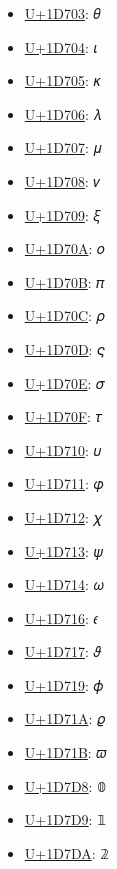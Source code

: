 \begin{itemize}
	\item \href{https://decodeunicode.org/en/u+1D703}{U+1D703}: 𝜃
	\item \href{https://decodeunicode.org/en/u+1D704}{U+1D704}: 𝜄
	\item \href{https://decodeunicode.org/en/u+1D705}{U+1D705}: 𝜅
	\item \href{https://decodeunicode.org/en/u+1D706}{U+1D706}: 𝜆
	\item \href{https://decodeunicode.org/en/u+1D707}{U+1D707}: 𝜇
	\item \href{https://decodeunicode.org/en/u+1D708}{U+1D708}: 𝜈
	\item \href{https://decodeunicode.org/en/u+1D709}{U+1D709}: 𝜉
	\item \href{https://decodeunicode.org/en/u+1D70A}{U+1D70A}: 𝜊
	\item \href{https://decodeunicode.org/en/u+1D70B}{U+1D70B}: 𝜋
	\item \href{https://decodeunicode.org/en/u+1D70C}{U+1D70C}: 𝜌
	\item \href{https://decodeunicode.org/en/u+1D70D}{U+1D70D}: 𝜍
	\item \href{https://decodeunicode.org/en/u+1D70E}{U+1D70E}: 𝜎
	\item \href{https://decodeunicode.org/en/u+1D70F}{U+1D70F}: 𝜏
	\item \href{https://decodeunicode.org/en/u+1D710}{U+1D710}: 𝜐
	\item \href{https://decodeunicode.org/en/u+1D711}{U+1D711}: 𝜑
	\item \href{https://decodeunicode.org/en/u+1D712}{U+1D712}: 𝜒
	\item \href{https://decodeunicode.org/en/u+1D713}{U+1D713}: 𝜓
	\item \href{https://decodeunicode.org/en/u+1D714}{U+1D714}: 𝜔
	\item \href{https://decodeunicode.org/en/u+1D716}{U+1D716}: 𝜖
	\item \href{https://decodeunicode.org/en/u+1D717}{U+1D717}: 𝜗
	\item \href{https://decodeunicode.org/en/u+1D719}{U+1D719}: 𝜙
	\item \href{https://decodeunicode.org/en/u+1D71A}{U+1D71A}: 𝜚
	\item \href{https://decodeunicode.org/en/u+1D71B}{U+1D71B}: 𝜛
	\item \href{https://decodeunicode.org/en/u+1D7D8}{U+1D7D8}: 𝟘
	\item \href{https://decodeunicode.org/en/u+1D7D9}{U+1D7D9}: 𝟙
	\item \href{https://decodeunicode.org/en/u+1D7DA}{U+1D7DA}: 𝟚

\end{itemize}
